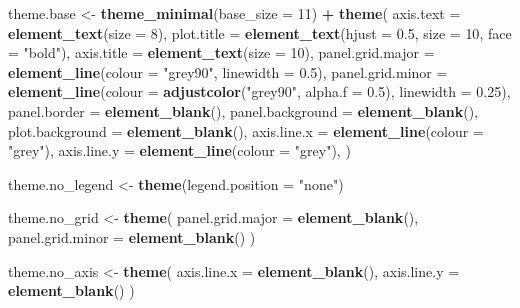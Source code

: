 \documentclass[
]{article}
\newenvironment{Shaded}{\begin{snugshade}}{\end{snugshade}}
\newcommand{\AttributeTok}[1]{\textcolor[rgb]{0.13,0.29,0.53}{#1}}
\newcommand{\DecValTok}[1]{\textcolor[rgb]{0.00,0.00,0.81}{#1}}
\newcommand{\FloatTok}[1]{\textcolor[rgb]{0.00,0.00,0.81}{#1}}
\newcommand{\FunctionTok}[1]{\textcolor[rgb]{0.13,0.29,0.53}{\textbf{#1}}}
\newcommand{\NormalTok}[1]{#1}
\newcommand{\OtherTok}[1]{\textcolor[rgb]{0.56,0.35,0.01}{#1}}
\newcommand{\SpecialCharTok}[1]{\textcolor[rgb]{0.81,0.36,0.00}{\textbf{#1}}}
\newcommand{\StringTok}[1]{\textcolor[rgb]{0.31,0.60,0.02}{#1}}
\begin{document}
\begin{Shaded}
\begin{Highlighting}[]
\NormalTok{theme.base }\OtherTok{\textless{}{-}} \FunctionTok{theme\_minimal}\NormalTok{(}\AttributeTok{base\_size =} \DecValTok{11}\NormalTok{) }\SpecialCharTok{+}
  \FunctionTok{theme}\NormalTok{(}
    \AttributeTok{axis.text =} \FunctionTok{element\_text}\NormalTok{(}\AttributeTok{size =} \DecValTok{8}\NormalTok{),}
    \AttributeTok{plot.title =} \FunctionTok{element\_text}\NormalTok{(}\AttributeTok{hjust =} \FloatTok{0.5}\NormalTok{, }\AttributeTok{size =} \DecValTok{10}\NormalTok{, }\AttributeTok{face =} \StringTok{"bold"}\NormalTok{),}
    \AttributeTok{axis.title =} \FunctionTok{element\_text}\NormalTok{(}\AttributeTok{size =} \DecValTok{10}\NormalTok{),}
    \AttributeTok{panel.grid.major =} \FunctionTok{element\_line}\NormalTok{(}\AttributeTok{colour =} \StringTok{"grey90"}\NormalTok{, }\AttributeTok{linewidth =} \FloatTok{0.5}\NormalTok{),}
    \AttributeTok{panel.grid.minor =} \FunctionTok{element\_line}\NormalTok{(}\AttributeTok{colour =} \FunctionTok{adjustcolor}\NormalTok{(}\StringTok{"grey90"}\NormalTok{, }\AttributeTok{alpha.f =} \FloatTok{0.5}\NormalTok{), }\AttributeTok{linewidth =} \FloatTok{0.25}\NormalTok{),}
    \AttributeTok{panel.border =} \FunctionTok{element\_blank}\NormalTok{(),}
    \AttributeTok{panel.background =} \FunctionTok{element\_blank}\NormalTok{(),}
    \AttributeTok{plot.background =} \FunctionTok{element\_blank}\NormalTok{(),}
    \AttributeTok{axis.line.x =} \FunctionTok{element\_line}\NormalTok{(}\AttributeTok{colour =} \StringTok{"grey"}\NormalTok{),}
    \AttributeTok{axis.line.y =} \FunctionTok{element\_line}\NormalTok{(}\AttributeTok{colour =} \StringTok{"grey"}\NormalTok{),}
\NormalTok{  )}

\NormalTok{theme.no\_legend }\OtherTok{\textless{}{-}} \FunctionTok{theme}\NormalTok{(}\AttributeTok{legend.position =} \StringTok{"none"}\NormalTok{)}

\NormalTok{theme.no\_grid }\OtherTok{\textless{}{-}}  \FunctionTok{theme}\NormalTok{(}
  \AttributeTok{panel.grid.major =} \FunctionTok{element\_blank}\NormalTok{(),}
  \AttributeTok{panel.grid.minor =} \FunctionTok{element\_blank}\NormalTok{()}
\NormalTok{)}

\NormalTok{theme.no\_axis }\OtherTok{\textless{}{-}} \FunctionTok{theme}\NormalTok{(}
  \AttributeTok{axis.line.x =} \FunctionTok{element\_blank}\NormalTok{(),}
  \AttributeTok{axis.line.y =} \FunctionTok{element\_blank}\NormalTok{()}
\NormalTok{)}


\end{Highlighting}
\end{Shaded}
\end{document}
